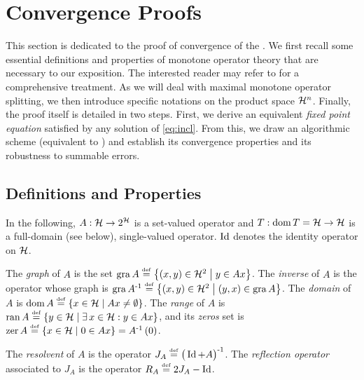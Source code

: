 
\section{Convergence Proofs}
\label{sec:proofs}

This section is dedicated to the proof of convergence of the \GFB. We first recall some essential definitions and properties of monotone operator theory that are necessary to our exposition. The interested reader may refer to \cite{BauschkeCombettes11,Phelps93} for a comprehensive treatment. As we will deal with maximal monotone operator splitting, we then introduce specific notations on the product space $\mathcal{H}^n$. Finally, the proof itself is detailed in two steps. First, we derive an equivalent \textit{fixed point equation} satisfied by any solution of \eqref{eq:incl}. From this, we draw an algorithmic scheme (equivalent to \GFB) and establish its convergence properties and its robustness to summable errors.

\subsection{Definitions and Properties}
\label{sec:defn-prop}

In the following, $A : \mathcal{H} \to 2^{\mathcal{H}}$ is a set-valued operator and $T : \operatorname{dom} T = \mathcal{H} \to \mathcal{H}$ is a full-domain (see below), single-valued operator. $\operatorname{Id}$ denotes the identity operator on $\mathcal{H}$.

\begin{definition}
\label{def:setvalued}
The \textit{graph} of $A$ is the set $\operatorname{gra} A \stackrel{\mathrm{\scriptscriptstyle{def}}}{=} \left\{  (x,y) \in \mathcal{H}^2 \;\middle|\; y \in Ax  \right\}$. The \textit{inverse} of $A$ is the operator whose graph is $\operatorname{gra} {A}^{\text{-}1} \stackrel{\mathrm{\scriptscriptstyle{def}}}{=} \left\{  (x,y) \in \mathcal{H}^2 \;\middle|\; (y,x) \in \operatorname{gra} A  \right\}$. The \textit{domain} of $A$ is $\operatorname{dom} A \stackrel{\mathrm{\scriptscriptstyle{def}}}{=} \left\{  x \in \mathcal{H} \;\middle|\; Ax \neq \emptyset  \right\}$. The \textit{range} of $A$ is $\operatorname{ran} A \stackrel{\mathrm{\scriptscriptstyle{def}}}{=} \left\{  y \in \mathcal{H} \;\middle|\; \exists \, x \in \mathcal{H} : y \in Ax  \right\}$, and its \textit{zeros} set is $\operatorname{zer} A \stackrel{\mathrm{\scriptscriptstyle{def}}}{=} \left\{  x \in \mathcal{H} \;\middle|\; 0 \in Ax  \right\} = {A}^{\text{-}1} \left( 0 \right)$.
\end{definition}

\begin{definition}
The \textit{resolvent} of $A$ is the operator $J_A \stackrel{\mathrm{\scriptscriptstyle{def}}}{=} {\big( \operatorname{Id}+A \big)}^{\text{-}1}$. The \textit{reflection operator} associated to $J_A$ is the operator $R_A \stackrel{\mathrm{\scriptscriptstyle{def}}}{=} 2 J_A - \operatorname{Id}$.
\end{definition}

